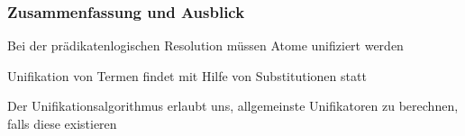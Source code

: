 \documentclass[onlymath]{beamer}
\begin{document}
% 
% 

% 
% 
% 


\begin{frame}\frametitle{Zusammenfassung und Ausblick}

Bei der prädikatenlogischen Resolution müssen Atome unifiziert werden\bigskip

Unifikation von Termen findet mit Hilfe von Substitutionen statt
\bigskip

Der Unifikationsalgorithmus erlaubt uns, allgemeinste Unifikatoren zu berechnen, falls
diese existieren
\bigskip


\end{frame}




% 
% 
% 
% 
% 
% 
\end{document}
